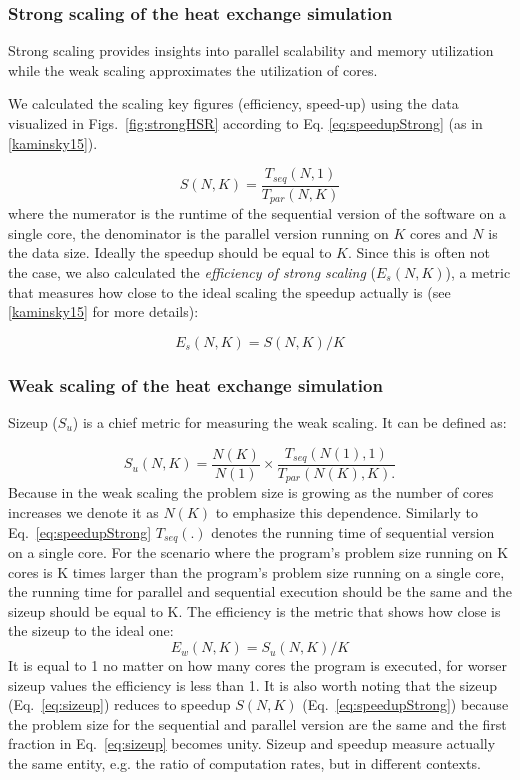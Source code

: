 \documentclass[3p,times]{elsarticle}
\begin{document}
\subsubsection{Strong scaling of the heat exchange simulation}
Strong scaling provides insights into parallel scalability and memory utilization while the weak scaling approximates the utilization of cores.

 We calculated the scaling key figures (efficiency, speed-up) using the data visualized in Figs.~\ref{fig:strongHSR} according to Eq. \ref{eq:speedupStrong} (as in \ref{kaminsky15}).

\begin{equation}
\label{eq:speedupStrong}
S(N,K) = \frac{T_{seq}(N,1)}{T_{par}(N,K)}
\end{equation}
where the numerator is the runtime of the sequential version of the software on a single core, the denominator is the parallel version running on $K$ cores and $N$ is the data size. Ideally the speedup should be equal to $K$. Since this is often not the case, we also calculated the \textit{efficiency of strong scaling} ($E_s(N,K)$), a metric that measures how close to the ideal scaling the speedup actually is (see \ref{kaminsky15} for more details):

$$
E_s(N,K) = S(N,K) / K
$$
 
\subsubsection{Weak scaling of the heat exchange simulation}


Sizeup ($S_u$) is a chief metric for measuring the weak scaling. It can be defined as: 

\begin{equation}
\label{eq:sizeup}
S_u(N,K) = \frac{N(K)}{N(1)} \times \frac{T_{seq}(N(1),1)}{T_{par}(N(K),K).}
\end{equation}
Because in the weak scaling the problem size is growing as the number of cores increases we denote it as $N(K)$ to emphasize this dependence. Similarly to Eq.~\ref{eq:speedupStrong} $T_{seq}(.)$ denotes the running time of sequential version on a single core. For the scenario where the program's problem size running on K cores is K times larger than the program's problem size running on a single core, the running time for parallel and sequential execution should be the same and the sizeup should be equal to K. The efficiency is the metric that shows how close is the sizeup to the ideal one: 
$$
E_w(N,K) = S_u(N,K) / K
$$
It is equal to 1 no matter on how many cores the program is executed, for worser sizeup values the efficiency is less than 1. It is also worth noting that the sizeup (Eq.~\ref{eq:sizeup}) reduces to speedup $S(N,K)$ (Eq.~\ref{eq:speedupStrong}) because the problem size for the sequential and parallel version are the same and the first fraction in Eq.~\ref{eq:sizeup} becomes unity. Sizeup and speedup measure actually the same entity, e.g. the ratio of computation rates, but in different contexts.
\end{document}
